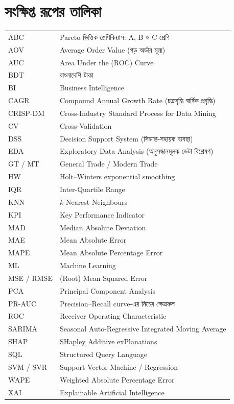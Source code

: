\chapter*{সংক্ষিপ্ত রূপের তালিকা}
\begin{tabular}{@{}ll@{}}
ABC    & Pareto-ভিত্তিক শ্রেণিবিন্যাস: A, B ও C শ্রেণি \\
AOV    & Average Order Value (গড় অর্ডার মূল্য) \\
AUC    & Area Under the (ROC) Curve \\
BDT    & বাংলাদেশি টাকা \\
BI     & Business Intelligence \\
CAGR   & Compound Annual Growth Rate (চক্রবৃদ্ধি বার্ষিক প্রবৃদ্ধি) \\
CRISP-DM & Cross-Industry Standard Process for Data Mining \\
CV     & Cross-Validation \\
DSS    & Decision Support System (সিদ্ধান্ত-সহায়ক ব্যবস্থা) \\
EDA    & Exploratory Data Analysis (অনুসন্ধানমূলক ডেটা বিশ্লেষণ) \\
GT / MT & General Trade / Modern Trade \\
HW     & Holt--Winters exponential smoothing \\
IQR    & Inter-Quartile Range \\
KNN    & $k$-Nearest Neighbours \\
KPI    & Key Performance Indicator \\
MAD    & Median Absolute Deviation \\
MAE    & Mean Absolute Error \\
MAPE   & Mean Absolute Percentage Error \\
ML     & Machine Learning \\
MSE / RMSE & (Root) Mean Squared Error \\
PCA    & Principal Component Analysis \\
PR-AUC & Precision--Recall curve-এর নিচের ক্ষেত্রফল \\
ROC    & Receiver Operating Characteristic \\
SARIMA & Seasonal Auto-Regressive Integrated Moving Average \\
SHAP   & SHapley Additive exPlanations \\
SQL    & Structured Query Language \\
SVM / SVR & Support Vector Machine / Regression \\
WAPE   & Weighted Absolute Percentage Error \\
XAI    & Explainable Artificial Intelligence \\
\end{tabular}
